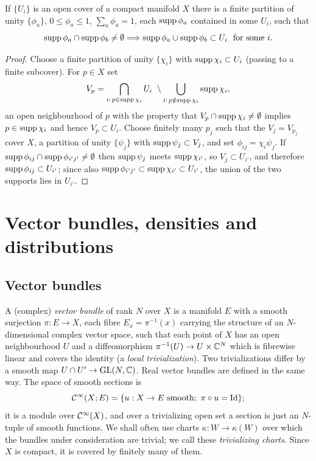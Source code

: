 \begin{lemma}\label{manifolds:lem:good-partition}
If $\{U_i\}$ is an open cover of a compact manifold $X$ there is a finite
partition of unity $\{\phi_a\}$, $0\le\phi_a\le1$, $\sum_a\phi_a=1$, each
$\operatorname{supp}\phi_a$ contained in some $U_i$, such that
\begin{equation}\label{manifolds:eq:good-partition}
\operatorname{supp}\phi_a\cap\operatorname{supp}\phi_b\ne\emptyset\Longrightarrow
\operatorname{supp}\phi_a\cup\operatorname{supp}\phi_b\subset U_i\ \text{ for some } i.
\end{equation}
\end{lemma}
\begin{proof}
Choose a finite partition of unity $\{\chi_i\}$ with $\operatorname{supp}\chi_i\subset U_i$
(passing to a finite subcover). For $p\in X$ set
\begin{equation*}
V_p=\bigcap_{i:\,p\in\supp\chi_i}U_i\ \setminus\bigcup_{i:\,p\notin\supp\chi_i}\supp\chi_i ,
\end{equation*}
an open neighbourhood of $p$ with the property that $V_p\cap\operatorname{supp}\chi_i\ne\emptyset$
implies $p\in\operatorname{supp}\chi_i$ and hence $V_p\subset U_i$. Choose finitely many
$p_j$ such that the $V_j=V_{p_j}$ cover $X$, a partition of unity $\{\psi_j\}$
with $\operatorname{supp}\psi_j\subset V_j$, and set $\phi_{ij}=\chi_i\psi_j$. If
$\operatorname{supp}\phi_{ij}\cap\operatorname{supp}\phi_{i'j'}\ne\emptyset$ then $\operatorname{supp}\psi_j$ meets
$\operatorname{supp}\chi_{i'}$, so $V_j\subset U_{i'}$, and therefore
$\operatorname{supp}\phi_{ij}\subset U_{i'}$; since also $\operatorname{supp}\phi_{i'j'}\subset\operatorname{supp}\chi_{i'}\subset U_{i'}$,
the union of the two supports lies in $U_{i'}$.
\end{proof}

\section{Vector bundles, densities and distributions}\label{manifolds:sec:bundles}

\subsection{Vector bundles}
A (complex) \emph{vector bundle} of rank $N$ over $X$ is a manifold $E$ with a
smooth surjection $\pi:E\to X$, each fibre $E_x=\pi^{-1}(x)$ carrying the
structure of an $N$-dimensional complex vector space, such that each point of
$X$ has an open neighbourhood $U$ and a diffeomorphism
$\pi^{-1}(U)\to U\times\mathbb{C}^N$ which is fibrewise linear and covers the identity
(a \emph{local trivialization}). Two trivializations differ by a smooth map
$U\cap U'\to\operatorname{GL}(N,\mathbb{C})$. Real vector bundles are defined in the same way. The
space of smooth sections is
\begin{equation*}
\CI(X;E)=\{u:X\to E \text{ smooth};\ \pi\circ u=\Id\};
\end{equation*}
it is a module over $\mathcal{C}^\infty(X)$, and over a trivializing open set a section is just
an $N$-tuple of smooth functions. We shall often use charts $\kappa:W\to\kappa(W)$
over which the bundles under consideration are trivial; we call these
\emph{trivializing charts}. Since $X$ is compact, it is covered by finitely many
of them.


